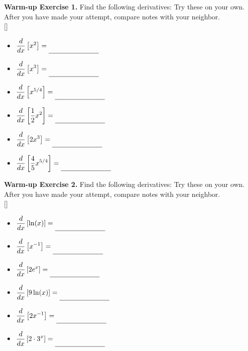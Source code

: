 \documentclass[10pt]{article}
\begin{document}

{\bf\color{blue} Warm-up Exercise 1.} Find the following derivatives: Try these on your own. After you have made your attempt, compare notes with your neighbor.\\

[\hfill]{
        \begin{itemize}
        \item $\ds \dfrac{d}{dx}\left[ x^2\right] = \unlineb{1}{}$
        \item $\ds \dfrac{d}{dx}\left[ x^3\right] = \unlineb{1}{}$
        \item $\ds \dfrac{d}{dx}\left[ x^{5/4}\right] = \unlineb{1}{}$
        \end{itemize}
}{
     \begin{itemize}
        \item $\ds \dfrac{d}{dx}\left[ \frac12x^2\right] = \unlineb{1}{}$
        \item $\ds \dfrac{d}{dx}\left[ 2x^3\right] = \unlineb{1}{}$
        \item $\ds \dfrac{d}{dx}\left[ \dfrac45x^{5/4}\right] = \unlineb{1}{}$
        \end{itemize}
}
\vfill
{\bf\color{blue} Warm-up Exercise 2.} Find the following derivatives: Try these on your own. After you have made your attempt, compare notes with your neighbor.\\
[\hfill]{
\begin{itemize}
        \item $\ds \dfrac{d}{dx}\left[ \ln(x)\right] = \unlineb{1}{}$
        \item $\ds \dfrac{d}{dx}\left[ x^{-1}\right] = \unlineb{1}{}$
           \item $\ds \dfrac{d}{dx}\left[ 2 e^x\right] = \unlineb{1}{}$
        \end{itemize}
}{
\begin{itemize}
        \item $\ds \dfrac{d}{dx}\left[ 9\ln(x)\right] = \unlineb{1}{}$
        \item $\ds \dfrac{d}{dx}\left[ 2x^{-1}\right] = \unlineb{1}{}$
                   \item $\ds \dfrac{d}{dx}\left[ 2 \cdot 3^x\right] = \unlineb{1}{}$
        \end{itemize}
}

\vfill
\newpage
\end{document}

